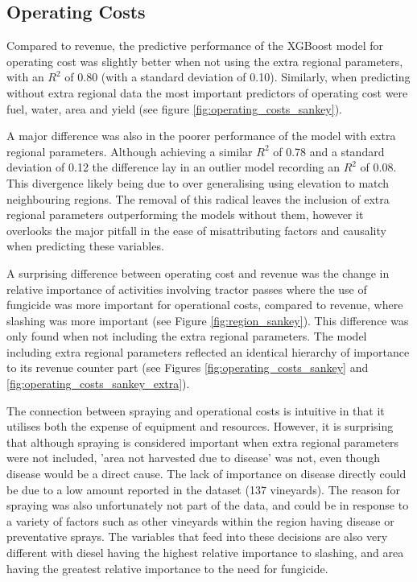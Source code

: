 \documentclass[review,12pt,authoryear]{elsarticle}
\begin{document}
\begin{linenumbers}
\subsection{Operating Costs}

Compared to revenue, the predictive performance of the XGBoost model for operating cost was slightly better when not using the extra regional parameters, with an $R^2$ of 0.80 (with a standard deviation of 0.10). Similarly, when predicting without extra regional data the most important predictors of operating cost were fuel, water, area and yield (see figure \ref{fig:operating_costs_sankey}).
\par
A major difference was also in the poorer performance of the model with extra regional parameters. Although achieving a similar $R^2$ of 0.78 and a standard deviation of 0.12 the difference lay in an outlier model recording an $R^2$ of 0.08. This divergence likely being due to over generalising using elevation to match neighbouring regions. The removal of this radical leaves the inclusion of extra regional parameters outperforming the models without them, however it overlooks the major pitfall in the ease of misattributing factors and causality when predicting these variables.
\par
A surprising difference between operating cost and revenue was the change in relative importance of activities involving tractor passes where the use of fungicide was more important for operational costs, compared to revenue, where slashing was more important (see Figure \ref{fig:region_sankey}). This difference was only found when not including the extra regional parameters. The model including extra regional parameters reflected an identical hierarchy of importance to its revenue counter part (see Figures \ref{fig:operating_costs_sankey} and \ref{fig:operating_costs_sankey_extra}).
\par
The connection between spraying and operational costs is intuitive in that it utilises both the expense of equipment and resources. However, it is surprising that although spraying is considered important when extra regional parameters were not included, 'area not harvested due to disease' was not, even though disease would be a direct cause. The lack of importance on disease directly could be due to a low amount reported in the dataset (137 vineyards). The reason for spraying was also unfortunately not part of the data, and could be in response to a variety of factors such as other vineyards within the region having disease or preventative sprays. The variables that feed into these decisions are also very different with diesel having the highest relative importance to slashing, and area having the greatest relative importance to the need for fungicide.

\end{linenumbers}
\end{document}
